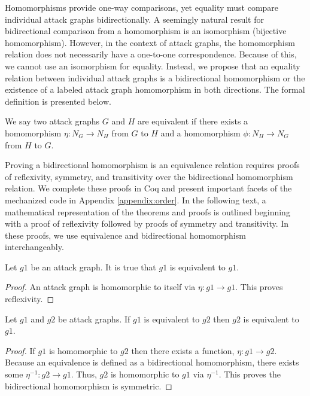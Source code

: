 \documentclass[runningheads]{llncs}
\theoremstyle{definition}
\begin{document}
Homomorphisms provide one-way comparisons, yet equality must compare individual attack graphs bidirectionally. A seemingly natural result for bidirectional comparison from a homomorphism is an isomorphism (bijective homomorphism). However, in the context of attack graphs, the homomorphism relation does not necessarily have a one-to-one correspondence. Because of this, we cannot use an isomorphism for equality. Instead, we propose that an equality relation between individual attack graphs is a bidirectional homomorphism or the existence of a labeled attack graph homomorphism in both directions. The formal definition is presented below.

\begin{definition}
    We say two attack graphs $G$ and $H$ are equivalent if there exists a  homomorphism $\eta : N_G \to N_H$ from $G$ to $H$ and a homomorphism $\phi : N_H \to N_G$ from $H$ to $G$.
\end{definition}

Proving a bidirectional homomorphism is an equivalence relation requires proofs of reflexivity, symmetry, and transitivity over the bidirectional homomorphism relation. We complete these proofs in Coq and present important facets of the mechanized code in Appendix \ref{appendix:order}. In the following text, a mathematical representation of the theorems and proofs is outlined beginning with a proof of reflexivity followed by proofs of symmetry and transitivity. In these proofs, we use equivalence and bidirectional homomorphism interchangeably.

\begin{theorem}
    Let $g1$ be an attack graph. It is true that $g1$ is equivalent to $g1$.
\end{theorem}
\begin{proof}
    An attack graph is homomorphic to itself via $\eta : g1 \to g1$. This proves reflexivity. 
\end{proof}

\begin{theorem}
    Let $g1$ and $g2$ be attack graphs. If $g1$ is equivalent to $g2$ then $g2$ is equivalent to $g1$. 
\end{theorem}
\begin{proof}
    If $g1$ is homomorphic to $g2$ then there exists a function, $\eta : g1 \to g2$. Because an equivalence is defined as a bidirectional homomorphism, there exists some $\eta^{-1} : g2 \to g1$. Thus, $g2$ is homomorphic to $g1$ via $\eta^{-1}$. This proves the bidirectional homomorphism is symmetric. 
\end{proof}
\end{document}
